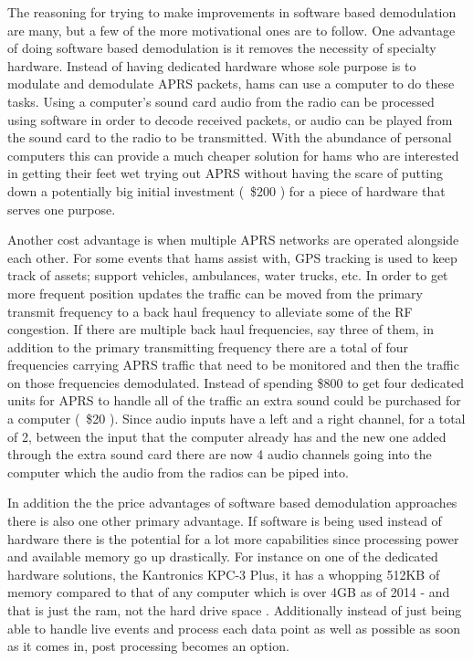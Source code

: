 The reasoning for trying to make improvements in software based demodulation are many, but a few of the more motivational ones are to follow. One advantage of doing software based demodulation is it removes the necessity of specialty hardware. Instead of having dedicated hardware whose sole purpose is to modulate and demodulate APRS packets, hams can use a computer to do these tasks. Using a computer's sound card audio from the radio can be processed using software in order to decode received packets, or audio can be played from the sound card to the radio to be transmitted. With the abundance of personal computers this can provide a much cheaper solution for hams who are interested in getting their feet wet trying out APRS without having the scare of putting down a potentially big initial investment (~\$200 \cite{Kantronics2014,Outlet2014}) for a piece of hardware that serves one purpose.

Another cost advantage is when multiple APRS networks are operated alongside each other. For some events that hams assist with, GPS tracking is used to keep track of assets; support vehicles, ambulances, water trucks, etc. In order to get more frequent position updates the traffic can be moved from the primary transmit frequency to a back haul frequency to alleviate some of the RF congestion. If there are multiple back haul frequencies, say three of them, in addition to the primary transmitting frequency there are a total of four frequencies carrying APRS traffic that need to be monitored and then the traffic on those frequencies demodulated. Instead of spending \$800 to get four dedicated units for APRS to handle all of the traffic an extra sound could be purchased for a computer (~\$20 \cite{Newegg}). Since audio inputs have a left and a right channel, for a total of 2, between the input that the computer already has and the new one added through the extra sound card there are now 4 audio channels going into the computer which the audio from the radios can be piped into.

In addition the the price advantages of software based demodulation approaches there is also one other primary advantage. If software is being used instead of hardware there is the potential for a lot more capabilities since processing power and available memory go up drastically. For instance on one of the dedicated hardware solutions, the Kantronics KPC-3 Plus, it has a whopping 512KB of memory compared to that of any computer which is over 4GB as of 2014 - and that is just the ram, not the hard drive space \cite{Kantronics2014,Graham-Smith2014}. Additionally instead of just being able to handle live events and process each data point as well as possible as soon as it comes in, post processing becomes an option.


